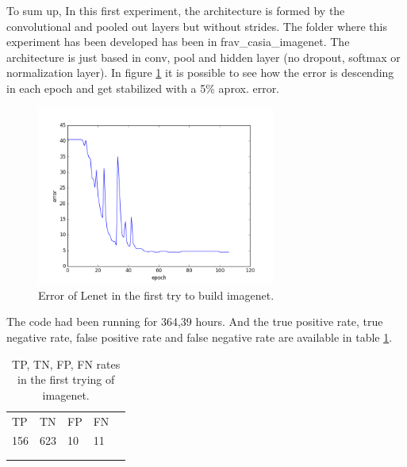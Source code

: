 To  sum up, In this first experiment, the architecture is formed by the convolutional and pooled out layers but without strides. The folder where this experiment has been developed has been in frav\_casia\_imagenet. The architecture is just based in conv, pool and hidden layer (no dropout, softmax or normalization layer). In figure \ref{fig:error_imagenet1} it is possible to see how the error is descending in each epoch and get stabilized with a 5\% aprox. error. \\
\begin{figure}[htb]
\centering
\includegraphics[width=0.7\textwidth]{images/imagenet/error_frav-Imagenet1.png}
\caption{Error of Lenet in the first try to build imagenet.} \label{fig:error_imagenet1}
\end{figure}

The code had been running for 364,39 hours. And the true positive rate, true negative rate, false positive rate and false negative rate are available in table \ref{tabla_error_imagenet1}. \\

\begin{table}[htb]
\centering
\label{tabla_error_imagenet1}
\begin{tabular}{lllll}
\cline{1-4}
\multicolumn{1}{|l}{TP} & \multicolumn{1}{l}{TN} & \multicolumn{1}{l}{FP} & \multicolumn{1}{l|}{FN} &  \\ \cline{1-4}
\multicolumn{1}{|l}{156} & \multicolumn{1}{l}{623} & \multicolumn{1}{l}{10} & \multicolumn{1}{l|}{11} &  \\ \cline{1-4}
                         &                         &                         &                         &  \\
                         &                         &                         &                         &
\end{tabular}
\caption{TP, TN, FP, FN rates in the first trying of imagenet.}

\end{table}

